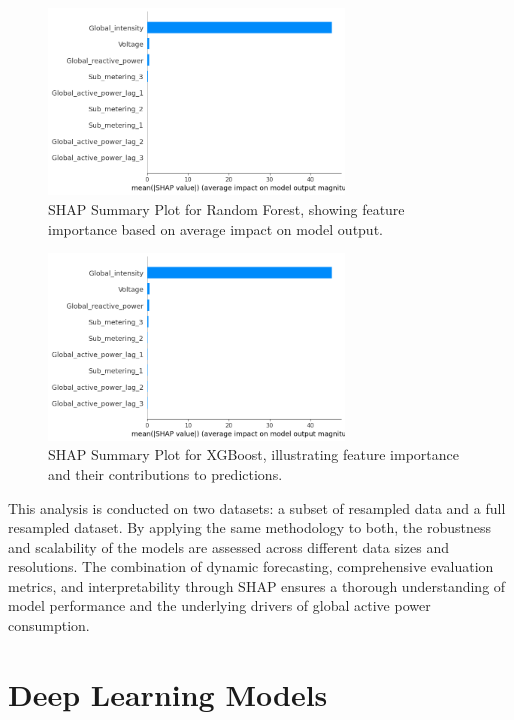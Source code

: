 	\begin{figure}[ht]
		\centering
		\includegraphics[width=0.7\textwidth]{./figures_aman/path_to_shap_rf_plot.png} %
		\caption{SHAP Summary Plot for Random Forest, showing feature importance based on average impact on model output.}
		\label{fig:shap_rf}
	\end{figure}
	
	\begin{figure}[ht]
		\centering
		\includegraphics[width=0.7\textwidth]{./figures_aman/path_to_shap_xgb_plot.png} %
		\caption{SHAP Summary Plot for XGBoost, illustrating feature importance and their contributions to predictions.}
		\label{fig:shap_xgb}
	\end{figure}
	
	This analysis is conducted on two datasets: a subset of resampled data and a full resampled dataset. By applying the same methodology to both, the robustness and scalability of the models are assessed across different data sizes and resolutions. The combination of dynamic forecasting, comprehensive evaluation metrics, and interpretability through SHAP ensures a thorough understanding of model performance and the underlying drivers of global active power consumption.
	
	\section{Deep Learning Models}
	
